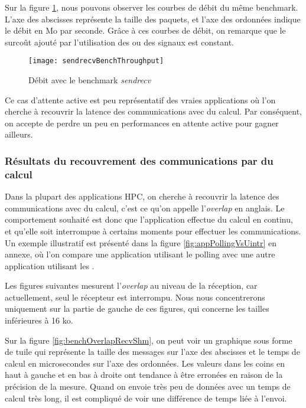 Sur la figure \ref{fig:sendrecvBenchThroughput}, nous pouvons observer les courbes de débit du même benchmark.
L'axe des abscisses représente la taille des paquets, et l'axe des ordonnées indique le débit en Mo par seconde.
Grâce à ces courbes de débit, on remarque que le surcoût ajouté par l'utilisation des \uintr{} ou des signaux est constant.

\begin{figure}[H]
  \texttt{[image: sendrecvBenchThroughput]}
  \caption{Débit avec le benchmark \emph{sendrecv}}
  \label{fig:sendrecvBenchThroughput}
\end{figure}

Ce cas d'attente active est peu représentatif des vraies applications où l'on cherche à recouvrir la latence des communications avec du calcul.
Par conséquent, on accepte de perdre un peu en performances en attente active pour gagner ailleurs.

\subsubsection{Résultats du recouvrement des communications par du calcul}

Dans la plupart des applications HPC, on cherche à recouvrir la latence des communications avec du calcul, c'est ce qu'on appelle l'\emph{overlap} en anglais.
Le comportement souhaité est donc que l'application effectue du calcul en continu, et qu'elle soit interrompue à certains moments pour effectuer les communications.
Un exemple illustratif est présenté dans la figure \ref{fig:appPollingVsUintr} en annexe, où l'on compare une application utilisant le polling avec une autre application utilisant les \uintr{}.

Les figures suivantes mesurent l'\emph{overlap} au niveau de la réception, car actuellement, seul le récepteur est interrompu.
Nous nous concentrerons uniquement sur la partie de gauche de ces figures, qui concerne les tailles inférieures à 16 ko.

Sur la figure \ref{fig:benchOverlapRecvShm}, on peut voir un graphique sous forme de tuile qui représente la taille des messages sur l'axe des abscisses
et le temps de calcul en microsecondes sur l'axe des ordonnées.
Les valeurs dans les coins en haut à gauche et en bas à droite ont tendance à être erronées en raison de la précision de la mesure.
Quand on envoie très peu de données avec un temps de calcul très long, il est compliqué de voir une différence de temps liée à l'envoi.

